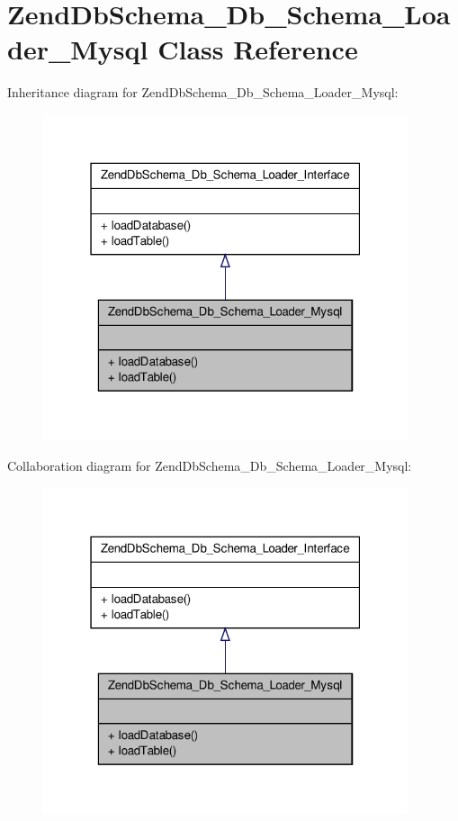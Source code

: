 \hypertarget{classZendDbSchema__Db__Schema__Loader__Mysql}{\section{\-Zend\-Db\-Schema\-\_\-\-Db\-\_\-\-Schema\-\_\-\-Loader\-\_\-\-Mysql \-Class \-Reference}
\label{classZendDbSchema__Db__Schema__Loader__Mysql}
}


\-Inheritance diagram for \-Zend\-Db\-Schema\-\_\-\-Db\-\_\-\-Schema\-\_\-\-Loader\-\_\-\-Mysql\-:\nopagebreak
\begin{figure}[H]
\begin{center}
\leavevmode
\includegraphics[width=304pt]{classZendDbSchema__Db__Schema__Loader__Mysql__inherit__graph}
\end{center}
\end{figure}


\-Collaboration diagram for \-Zend\-Db\-Schema\-\_\-\-Db\-\_\-\-Schema\-\_\-\-Loader\-\_\-\-Mysql\-:\nopagebreak
\begin{figure}[H]
\begin{center}
\leavevmode
\includegraphics[width=304pt]{classZendDbSchema__Db__Schema__Loader__Mysql__coll__graph}
\end{center}
\end{figure}
